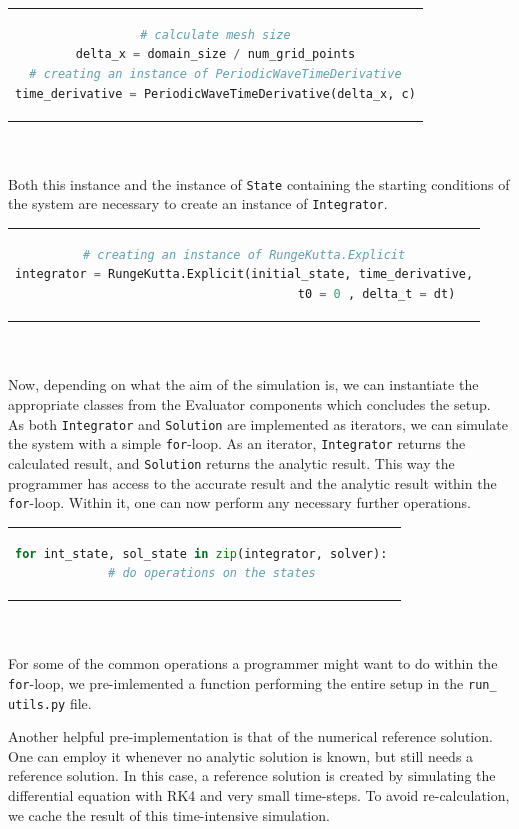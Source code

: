 \begin{tabular}{c}
\begin{lstlisting}[language=Python]
# calculate mesh size
delta_x = domain_size / num_grid_points
# creating an instance of PeriodicWaveTimeDerivative
time_derivative = PeriodicWaveTimeDerivative(delta_x, c)
\end{lstlisting}
\end{tabular}\\\\
Both this instance and the instance of \texttt{State} containing the starting conditions of the system are necessary to create an instance of \texttt{Integrator}.\\
\begin{tabular}{c}
\begin{lstlisting}[language=Python]
# creating an instance of RungeKutta.Explicit
integrator = RungeKutta.Explicit(initial_state, time_derivative,
                                     t0 = 0 , delta_t = dt)
\end{lstlisting}
\end{tabular}
\\\\
Now, depending on what the aim of the simulation is, we can instantiate the appropriate classes from the Evaluator components which concludes the setup.
\\
As both \texttt{Integrator} and \texttt{Solution} are implemented as iterators, we can simulate the system with a simple \texttt{for}-loop.
As an iterator, \texttt{Integrator} returns the calculated result, and \texttt{Solution} returns the analytic result.
This way the programmer has access to the accurate result and the analytic result within the \texttt{for}-loop.
Within it, one can now perform any necessary further operations.\\
\begin{tabular}{c}
\begin{lstlisting}[language=Python]
for int_state, sol_state in zip(integrator, solver): 
  # do operations on the states
\end{lstlisting}
\end{tabular}
\\\\
For some of the common operations a programmer might want to do within the \texttt{for}-loop, we pre-imlemented a function performing the entire setup in the \texttt{run\_ utils.py} file.

Another helpful pre-implementation is that of the numerical reference solution.
One can employ it whenever no analytic solution is known, but still needs a reference solution.
In this case, a reference solution is created by simulating the differential equation with RK4 and very small time-steps.
To avoid re-calculation, we cache the result of this time-intensive simulation.

